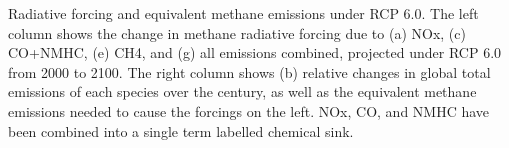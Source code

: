 Radiative forcing and equivalent methane emissions under RCP 6.0. The left column shows the change in methane radiative forcing due to (a) NOx, (c) CO+NMHC, (e) CH4, and (g) all emissions combined, projected under RCP 6.0 from 2000 to 2100. The right column shows (b) relative changes in global total emissions of each species over the century, as well as the equivalent methane emissions needed to cause the forcings on the left. NOx, CO, and NMHC have been combined into a single term labelled chemical sink.\label{fig:eqems}